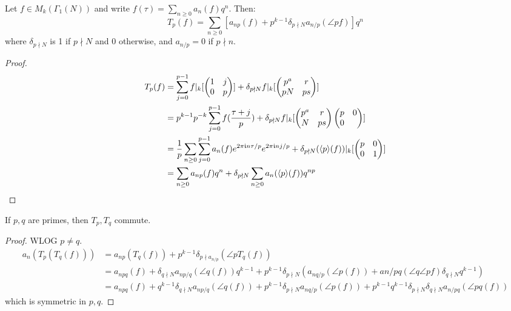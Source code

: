 \documentclass[10pt,a4paper]{article}
\begin{document}
\begin{proposition}
  Let $f \in M_k(\Gamma_1(N))$ and write $f(\tau)  =\sum_{n\geq 0}a_n(f)q^n$. Then:
  \[T_p(f) = \sum_{n\geq 0}[a_{np}(f) + p^{k-1}\delta_{p\nmid N}a_{n/p}(\angle{p}f)]q^n\]
  where $\delta_{p\nmid N}$ is 1 if $p\nmid N$ and 0 otherwise, and $a_{n/p} = 0$ if $p \nmid n$.
\end{proposition}
\begin{proof}
  \begin{align*}
    T_p(f) &= \sum_{j =0}^{p-1}f|_k[\begin{pmatrix}1&j\\0&p\end{pmatrix}] + \delta_{p\nmid N}f|_k[\begin{pmatrix}p^a&r\\pN&ps\end{pmatrix}] \\
    &= p^{k-1}p^{-k} \sum_{j=0}^{p-1} f(\frac{\tau+j}{p}) + \delta_{p\nmid N}f|_k[\begin{pmatrix}p^a&r\\N&ps\end{pmatrix}\begin{pmatrix}p&0\\0&\end{pmatrix}]\\
    &= \frac{1}{p}\sum_{n\geq 0}\sum_{j=0}^{p-1}a_n(f)e^{2\pi\mathfrak{i} n\tau/p}e^{2\pi\mathfrak{i} n j/p}+\delta_{p\nmid N}(\langle p \rangle(f))|_k [\begin{pmatrix}p&0\\0&1\end{pmatrix}]\\
    &= \sum_{n\geq 0}a_{np}(f)q^{n} + \delta_{p\nmid N}\sum_{n\geq 0}a_n(\langle p \rangle(f))q^{np}
  \end{align*}
\end{proof}
\begin{corollary}
  If $p, q$ are primes, then $T_p, T_q$ commute.
\end{corollary}
\begin{proof}
  WLOG $p \neq q$.
  \begin{align*}
    a_n(T_p(T_q(f))) &= a_{np}(T_q(f))+p^{k-1}\delta_{p\nmid a_{n/p}}(\angle{p}T_q(f)) \\
    &= a_{npq}(f) + \delta_{q \nmid N}a_{np/q}(\angle{q}(f))q^{k-1} + p^{k-1}\delta_{p\nmid N}(a_{nq/p}(\angle{p}(f)) + a{n/pq}(\angle{q}\angle{p}f)\delta_{q\nmid N}q^{k-1})\\
    &= a_{npq}(f) + q^{k-1}\delta_{q\nmid N}a_{np/q}(\angle{q}(f)) + p^{k-1}\delta_{p\nmid N}a_{nq/p}(\angle{p}(f)) + p^{k-1}q^{k-1}\delta_{p\nmid N}\delta_{q\nmid N}a_{n/pq}(\angle{pq}(f))
  \end{align*}
  which is symmetric in $p,q$.
\end{proof}
\end{document}
